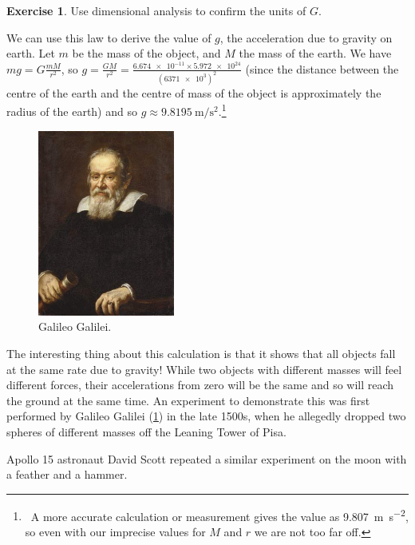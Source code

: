 \documentclass[a4paper]{amsbook}
\theoremstyle{definition}
\newtheorem{exercise}{Exercise}
\numberwithin{exercise}{chapter}
\numberwithin{exercise}{chapter}
\newcommand\capcite[1]{}
\begin{document}
\begin{exercise}
  Use dimensional analysis to confirm the units of $ G $.
\end{exercise}

We can use this law to derive the value of $ g $, the acceleration due to gravity on earth. Let $ m $ be the mass of the object, and $ M $ the
mass of the earth. We have $ mg = G\frac{mM}{r^2} $, so $ g = \frac{GM}{r^2} = \frac{\num{6.674e-11} \times \num{5.972e24}}{(\num{6371e3})^2} $
(since the distance between the centre of the earth and the centre of mass of the object is approximately the radius of the earth) and
so $ g \approx \SI{9.8195}{\metre\per\second\squared} $.\footnote{~A more accurate calculation or measurement gives the value
as \SI{9.807}{\metre\per\second\squared}, so even with our imprecise values for $ M $ and $ r $ we are not too far off.}

\begin{figure}
  \centering
  \includegraphics[width=0.4\textwidth]{galileo}
  \caption{Galileo Galilei. \capcite{https://media1.britannica.com/eb-media/58/95758-004-BD98B43B.jpg}\label{fig:galileo}}
\end{figure}

The interesting thing about this calculation is that it shows that all objects fall at the same rate due to gravity! While two objects with
different masses will feel different forces, their accelerations from zero will be the same and so will reach the ground at the same time. An
experiment to demonstrate this was first performed by Galileo Galilei (\cref{fig:galileo}) in the late 1500s, when he allegedly dropped two
spheres of different masses off the Leaning Tower of Pisa.

Apollo 15 astronaut David Scott repeated a similar experiment on the moon with a feather and a hammer.
\end{document}
